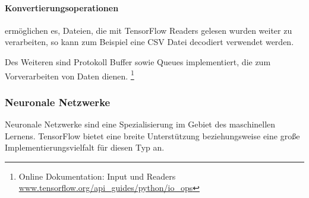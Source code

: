 \paragraph{Konvertierungsoperationen} ermöglichen es, Dateien, die mit TensorFlow Readers gelesen wurden weiter zu verarbeiten, so kann zum Beispiel eine CSV Datei decodiert verwendet werden.
\phantom \newline

\noindent
Des Weiteren sind Protokoll Buffer sowie Queues implementiert, die zum Vorverarbeiten von Daten dienen.
\footnote{Online Dokumentation: Input und Readers \url{www.tensorflow.org/api_guides/python/io_ops}}

\subsubsection{Neuronale Netzwerke}

Neuronale Netzwerke sind eine Spezialisierung im Gebiet des maschinellen Lernens. 
TensorFlow bietet eine breite Unterstützung beziehungsweise eine große Implementierungsvielfalt für diesen Typ an. 

